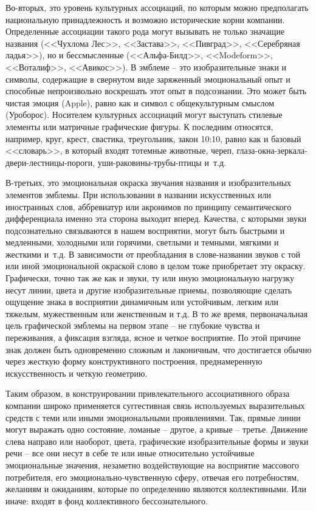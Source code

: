Во-вторых, это уровень культурных ассоциаций, по которым можно предполагать
национальную принадлежность и возможно  исторические корни компании. Определенные
ассоциации такого рода могут вызывать не только значащие
названия (<<Чухлома Лес>>, <<Застава>>, <<Пивград>>, <<Серебряная ладья>>), но
и бессмысленные (<<Альфа-Билд>>, <<Modeform>>, <<Воталиф>>, <<Авикос>>).
В эмблеме -- это изобразительные знаки и символы, содержащие в свернутом виде
заряженный эмоциональный опыт и способные непроизвольно воскрешать этот опыт
в подсознании. Это может быть чистая эмоция (Apple), равно как и символ с
общекультурным смыслом (Уроборос). Носителем культурных ассоциаций могут
выступать стилевые элементы или матричные графические фигуры. К последним
относятся, например, круг, крест, свастика, треугольник, закон 10:10,
равно как и базовый <<словарь>>, в который входят тотемные животные, череп,
глаза-окна-зеркала-двери-лестницы-пороги, уши-раковины-трубы-птицы
и~т.д\autocite{link:grigorevalj}.

В-третьих, это эмоциональная окраска звучания названия и изобразительных
элементов эмблемы. При использовании в названии искусственных или иностранных
слов, аббревиатур или акронимов по принципу семантического дифференциала именно
эта сторона выходит вперед. Качества, с которыми звуки подсознательно связываются
в нашем восприятии, могут быть быстрыми и медленными, холодными или горячими,
светлыми и темными, мягкими и жесткими
и~т.д\autocite{juravlev1991zvuk}. В зависимости от преобладания в слове-названии
звуков с той или иной эмоциональной окраской слово в целом тоже приобретает эту
окраску. Графически, точно так же как и звуки, ту или иную эмоциональную
нагрузку несут линии, цвета и другие изобразительные приемы, позволяющие
сделать ощущение знака в восприятии динамичным или устойчивым, легким или
тяжелым, мужественным или женственным и т.д. В то же время, первоначальная цель
графической эмблемы на первом этапе -- не глубокие чувства и переживания, а
фиксация взгляда, ясное и четкое восприятие. По этой причине знак должен быть
одновременно сложным и лаконичным, что достигается обычно через жесткую форму
конструктивного построения, преднамеренную искусственность и четкую геометрию.

Таким образом, в конструировании привлекательного ассоциативного образа компании
широко применяется суггестивная связь используемых выразительных средств с теми
или иными эмоциональными проявлениями. Так, прямые линии  могут выражать одно
состояние, ломаные -- другое, а кривые -- третье. Движение слева направо или
наоборот,  цвета, графические изобразительные формы и звуки речи -- все они
несут в себе те или иные относительно устойчивые эмоциональные значения,
незаметно воздействующие на восприятие массового потребителя, его
эмоционально-чувственную сферу, отвечая его потребностям, желаниям и ожиданиям,
которые по определению являются коллективными. Или иначе: входят в фонд
коллективного бессознательного.

